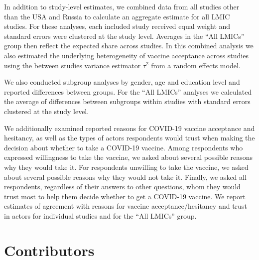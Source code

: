 \documentclass[
  12pt,
]{article}
\begin{document}
In addition to study-level estimates, we combined data from all studies other than the USA and Russia to calculate an aggregate estimate for all LMIC studies. For these analyses, each included study received equal weight and standard errors were clustered at the study level. Averages in the ``All LMICs'' group then reflect the expected share across studies. In this combined analysis we also estimated the underlying heterogeneity of vaccine acceptance across studies using the between studies variance estimator \(\tau^2\) from a random effects model.

We also conducted subgroup analyses by gender, age and education level and reported differences between groups. For the ``All LMICs'' analyses we calculated the average of differences between subgroups within studies with standard errors clustered at the study level.

We additionally examined reported reasons for COVID-19 vaccine acceptance and hesitancy, as well as the types of actors respondents would trust when making the decision about whether to take a COVID-19 vaccine. Among respondents who expressed willingness to take the vaccine, we asked about several possible reasons why they would take it. For respondents unwilling to take the vaccine, we asked about several possible reasons why they would not take it. Finally, we asked all respondents, regardless of their answers to other questions, whom they would trust most to help them decide whether to get a COVID-19 vaccine. We report estimates of agreement with reasons for vaccine acceptance/hesitancy and trust in actors for individual studies and for the ``All LMICs'' group.

\newpage

\hypertarget{contributors}{%
\section*{Contributors}\label{contributors}}
\end{document}
